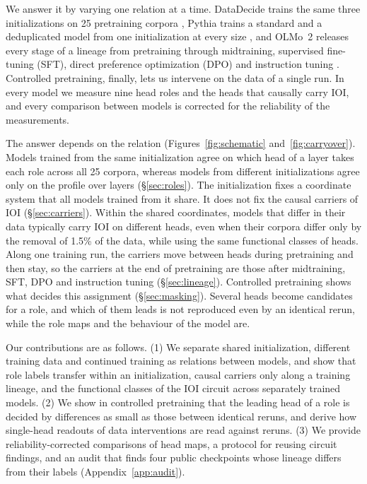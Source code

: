 \documentclass[11pt]{article}
\begin{document}
We answer it by varying one relation at a time.
DataDecide trains the same three initializations on 25 pretraining corpora \citep{magnusson2025datadecide}, Pythia trains a standard and a deduplicated model from one initialization at every size \citep{biderman2023pythia}, and OLMo~2 releases every stage of a lineage from pretraining through midtraining, supervised fine-tuning (SFT), direct preference optimization (DPO) and instruction tuning \citep{olmo2024olmo2}.
Controlled pretraining, finally, lets us intervene on the data of a single run.
In every model we measure nine head roles and the heads that causally carry IOI, and every comparison between models is corrected for the reliability of the measurements.

The answer depends on the relation (Figures~\ref{fig:schematic} and~\ref{fig:carryover}).
Models trained from the same initialization agree on which head of a layer takes each role across all 25 corpora, whereas models from different initializations agree only on the profile over layers (\S\ref{sec:roles}).
The initialization fixes a coordinate system that all models trained from it share.
It does not fix the causal carriers of IOI (\S\ref{sec:carriers}).
Within the shared coordinates, models that differ in their data typically carry IOI on different heads, even when their corpora differ only by the removal of 1.5\% of the data, while using the same functional classes of heads.
Along one training run, the carriers move between heads during pretraining and then stay, so the carriers at the end of pretraining are those after midtraining, SFT, DPO and instruction tuning (\S\ref{sec:lineage}).
Controlled pretraining shows what decides this assignment (\S\ref{sec:masking}).
Several heads become candidates for a role, and which of them leads is not reproduced even by an identical rerun, while the role maps and the behaviour of the model are.

Our contributions are as follows.
(1) We separate shared initialization, different training data and continued training as relations between models, and show that role labels transfer within an initialization, causal carriers only along a training lineage, and the functional classes of the IOI circuit across separately trained models.
(2) We show in controlled pretraining that the leading head of a role is decided by differences as small as those between identical reruns, and derive how single-head readouts of data interventions are read against reruns.
(3) We provide reliability-corrected comparisons of head maps, a protocol for reusing circuit findings, and an audit that finds four public checkpoints whose lineage differs from their labels (Appendix~\ref{app:audit}).
\end{document}
